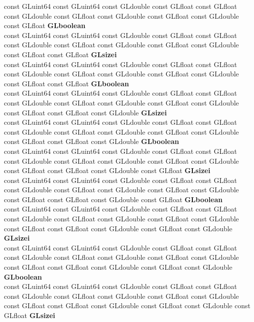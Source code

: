 \begin{DoxyCompactItemize}
\begin{tabbing}
\>const GLuint64 const GLuint64 const GLdouble const GLfloat const GLfloat const GLdouble const GLfloat const GLdouble const GLfloat const GLdouble const GLfloat {\bfseries GLboolean}\\
\>const GLuint64 const GLuint64 const GLdouble const GLfloat const GLfloat const GLdouble const GLfloat const GLdouble const GLfloat const GLdouble const GLfloat const GLfloat {\bfseries GLsizei}\\
\>const GLuint64 const GLuint64 const GLdouble const GLfloat const GLfloat const GLdouble const GLfloat const GLdouble const GLfloat const GLdouble const GLfloat const GLfloat {\bfseries GLboolean}\\
\>const GLuint64 const GLuint64 const GLdouble const GLfloat const GLfloat const GLdouble const GLfloat const GLdouble const GLfloat const GLdouble const GLfloat const GLfloat const GLdouble {\bfseries GLsizei}\\
\>const GLuint64 const GLuint64 const GLdouble const GLfloat const GLfloat const GLdouble const GLfloat const GLdouble const GLfloat const GLdouble const GLfloat const GLfloat const GLdouble {\bfseries GLboolean}\\
\>const GLuint64 const GLuint64 const GLdouble const GLfloat const GLfloat const GLdouble const GLfloat const GLdouble const GLfloat const GLdouble const GLfloat const GLfloat const GLdouble const GLfloat {\bfseries GLsizei}\\
\>const GLuint64 const GLuint64 const GLdouble const GLfloat const GLfloat const GLdouble const GLfloat const GLdouble const GLfloat const GLdouble const GLfloat const GLfloat const GLdouble const GLfloat {\bfseries GLboolean}\\
\>const GLuint64 const GLuint64 const GLdouble const GLfloat const GLfloat const GLdouble const GLfloat const GLdouble const GLfloat const GLdouble const GLfloat const GLfloat const GLdouble const GLfloat const GLdouble {\bfseries GLsizei}\\
\>const GLuint64 const GLuint64 const GLdouble const GLfloat const GLfloat const GLdouble const GLfloat const GLdouble const GLfloat const GLdouble const GLfloat const GLfloat const GLdouble const GLfloat const GLdouble {\bfseries GLboolean}\\
\>const GLuint64 const GLuint64 const GLdouble const GLfloat const GLfloat const GLdouble const GLfloat const GLdouble const GLfloat const GLdouble const GLfloat const GLfloat const GLdouble const GLfloat const GLdouble const GLfloat {\bfseries GLsizei}\\

\end{tabbing}
\end{DoxyCompactItemize}
